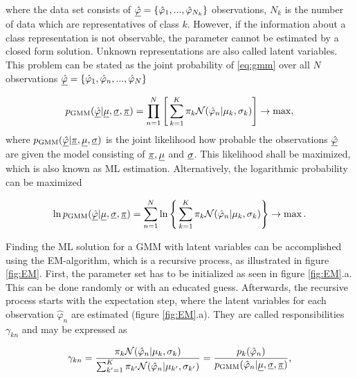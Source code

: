 where the data set consists of $\underline{\hat{\varphi}} = \{\hat{\varphi}_1,...,\hat{\varphi}_{N_k}\}$ observations, $N_k$ is the number of data which are representatives of class $k$.
However, if the information about a class representation is not observable, the parameter cannot be estimated by a closed form solution. Unknown representations are also called latent variables. This problem can be stated as the joint probability of \ref{eq:gmm} over all $N$ observations $\underline{\hat{\varphi}} = \{\hat{\varphi}_1, \hat{\varphi}_n,...,\hat{\varphi}_N \}$

\begin{equation}
p_\text{GMM}(\underline{\hat{\varphi}}|\underline{\mu},\underline{\sigma}, \underline{\pi}) = \prod^{N}_{n=1}\Bigg[\sum^K_{k=1}\pi_k\mathcal{N}( \hat{\varphi}_n|\mu_k,\sigma_k)\Bigg] \rightarrow \max,
\label{eq:ML}
\end{equation}
where $p_\text{GMM}(\underline{\hat{\varphi}}|\underline{\pi},\underline{\mu},\underline{\sigma}) $ is the joint likelihood how probable the observations $\underline{\hat \varphi}$ are given the model consisting of $\underline{\pi},\underline{\mu}$ and $\underline{\sigma}$. This likelihood shall be maximized, which is also known as \ac{ML} estimation. Alternatively, the logarithmic probability can be maximized

\begin{equation}
\ln p_\text{GMM}(\underline{\hat{\varphi}} |\underline{\mu},\underline{\sigma}, \underline{\pi}) = \sum^{N}_{n=1}\ln\Bigg\{\sum^K_{k=1}\pi_k\mathcal{N}(\hat{\varphi}_n|\mu_k,\sigma_k)\Bigg\} \rightarrow \max.
\label{eq:log_ML}
\end{equation}

Finding the \ac{ML} solution for a \ac{GMM} with latent variables can be accomplished using the \ac{EM}-algorithm, which is a recursive process, as illustrated in figure \ref{fig:EM}. First, the parameter set has to be initialized as seen in figure \ref{fig:EM}.a. This can be done randomly or with an educated guess. Afterwards, the recursive process starts with the expectation step, where the latent variables for each observation $\hat{\varphi}_n$ are estimated (figure \ref{fig:EM}.a). They are called responsibilities $\gamma_{kn}$ and may be expressed as

\begin{equation}
\gamma_{kn} = \frac{\pi_k \mathcal{N}(\hat{\varphi}_n|\mu_k,\sigma_k)}{\sum^K_{k'=1} \pi_{k'}\mathcal{N}(\hat{\varphi}_n|\mu_{k'},\sigma_{k'})} = \frac{p_k(\hat{\varphi}_n)}{p_\text{GMM}(\hat{\varphi}_n|\underline{\mu},\underline{\sigma}, \underline{\pi})},
\label{eq:em_gamma}
\end{equation}

